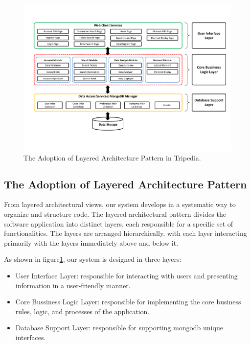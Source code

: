 \documentclass[conference]{IEEEtran}
\begin{document}
\begin{figure}[htbp]
\centerline{\includegraphics[width=1.0\textwidth]{Architecture2.pdf}}
\caption{The Adoption of Layered Architecture Pattern in Tripedia.}
\label{system_layered}
\end{figure}


\subsection{\textbf{The Adoption of Layered Architecture Pattern}}

From layered architectural views, our system develops in a systematic way to organize and structure code. The layered architectural pattern divides the software application into distinct layers, each responsible for a specific set of functionalities. The layers are arranged hierarchically, with each layer interacting primarily with the layers immediately above and below it. 

As shown in figure\ref{system_layered}, our system is designed in three layers: 

\begin{itemize}
    \item User Interface Layer: responsible for interacting with users and presenting information in a user-friendly manner.

    \item Core Bussiness Logic Layer: responsible for implementing the core business rules, logic, and processes of the application.

    \item Database Support Layer: responsible for supporting mongodb unique interfaces.
\end{itemize}
\end{document}
